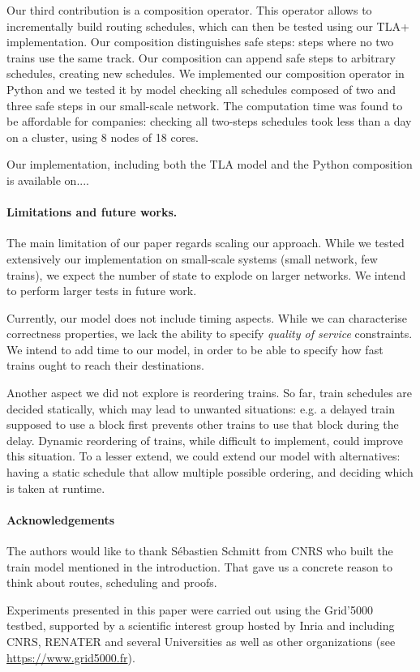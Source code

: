 \documentclass[runningheads]{llncs}
\begin{document}
Our third contribution is a composition operator. This operator allows to incrementally build routing schedules, which can then be tested using our TLA+ implementation. Our composition distinguishes safe steps: steps where no two trains use the same track. Our composition can append safe steps to arbitrary schedules, creating new schedules. We implemented our composition operator in Python and we tested it by model checking all schedules composed of two and three safe steps in our small-scale network. The computation time was found to be affordable for companies: checking all two-steps schedules took less than a day on a cluster, using 8 nodes of 18 cores.

Our implementation, including both the TLA model and the Python composition is available on....

\paragraph{Limitations and future works.}
The main limitation of our paper regards scaling our approach. While we tested extensively our implementation on small-scale systems (small network, few trains), we expect the number of state to explode on larger networks. We intend to perform larger tests in future work.

Currently, our model does not include timing aspects. While we can characterise correctness properties, we lack the ability to specify \emph{quality of service} constraints. We intend to add time to our model, in order to be able to specify how fast trains ought to reach their destinations.

Another aspect we did not explore is reordering trains. So far, train schedules are decided statically, which may lead to unwanted situations: e.g. a delayed train supposed to use a block first prevents other trains to use that block during the delay. Dynamic reordering of trains, while difficult to implement, could improve this situation. To a lesser extend, we could extend our model with alternatives: having a static schedule that allow multiple possible ordering, and deciding which is taken at runtime.


\paragraph{Acknowledgements} The authors would like to thank Sébastien Schmitt from CNRS who built the train model mentioned in the introduction. That gave us a concrete reason to think about routes, scheduling and proofs.

Experiments presented in this paper were carried out using the Grid'5000 testbed, supported by a scientific interest group hosted by Inria and including CNRS, RENATER and several Universities as well as other organizations (see \url{https://www.grid5000.fr}).



\end{document}
